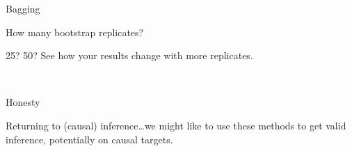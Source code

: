 \documentclass[xcolor={table}, handout]{beamer}
\begin{document}

\begin{frame}{Bagging}

\begin{wideitemize}
\item How many bootstrap replicates? \pause
\item 25? 50? \pause See how your results change with more replicates. 
\end{wideitemize}

\end{frame}



\begin{transitionframe}
\centering

\LARGE \textcolor{white}{Honesty.}

\end{transitionframe}
\begin{frame}{Honesty}

\begin{wideitemize}
\item Returning to (causal) inference\dots \pause we might like to use these methods to get valid inference, potentially on causal targets. 
\end{wideitemize}

\end{frame}


\end{document}
